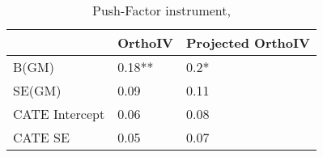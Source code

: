 \begin{table}\centering\caption{Push-Factor instrument, }\begin{tabular}{lll}
\toprule
                & OrthoIV   & Projected OrthoIV   \\
\midrule
 B(GM)          & 0.18**    & 0.2*                \\
 SE(GM)         & 0.09      & 0.11                \\
 CATE Intercept & 0.06      & 0.08                \\
 CATE SE        & 0.05      & 0.07                \\
\bottomrule
\end{tabular}\end{table}